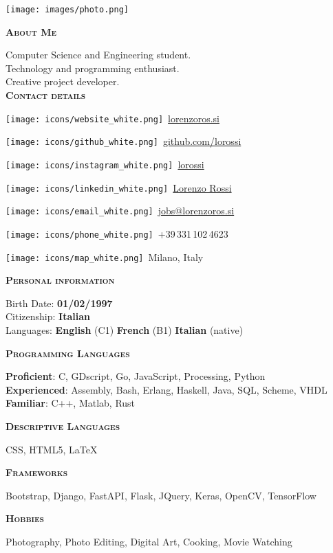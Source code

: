 \documentclass[11pt, a4paper]{article}
\makeatletter
\newcommand{\leftsection}[1]{\vspace*{2ex}\textsc{\textbf{#1}}\par%
\vspace*{-1.5ex}\hrulefill\par\vspace*{0.7ex}}
\newcommand{\websiteline}{\par{\texttt{[image: icons/website\_white.png]}}\ \href{https://www.lorenzoros.si}{lorenzoros.si}}
\newcommand{\emailline}{\par{\texttt{[image: icons/email\_white.png]}}\ \href{mailto:jobs@lorenzoros.si}{jobs@lorenzoros.si} }
\newcommand{\githubline}{\par{\texttt{[image: icons/github\_white.png]}}\ \href{https://www.github.com/lorossi}{github.com/lorossi}}
\newcommand{\linkedinline}{\par{\texttt{[image: icons/linkedin\_white.png]}}\ \href{https://www.linkedin.com/in/lorenzo-rossi-897628212/}{Lorenzo Rossi}}
\newcommand{\instagramline}{\par{\texttt{[image: icons/instagram\_white.png]}}\ \href{https://www.instagram.com/lorossi/}{lorossi}}
\newcommand{\phoneline}{\par{\texttt{[image: icons/phone\_white.png]}}\ +39\,331\,102\,4623}
\newcommand{\mapline}{\par{\texttt{[image: icons/map\_white.png]}}\ Milano, Italy}
\makeatother
\begin{document}
\setlength{\topskip}{0pt}
\setlength{\parindent}{0pt}
\setlength{\parskip}{0pt}
\setlength{\fboxsep}{0pt}
\pagestyle{empty}
\raggedbottom

\begin{minipage}[t]{0.30\textwidth} %

  \colorbox{cvblue}{
    \color{white}  %
    \hspace{1em}  %
    \begin{minipage}[t][\textheight][t]{0.82\textwidth}
      \raggedright
      \vspace*{2.5ex}

      \null\hfill\texttt{[image: images/photo.png]}\hfill\null

      \vspace*{0.5ex} %

      \leftsection{About Me}
      Computer Science and Engineering student. \\
      Technology and programming enthusiast. \\
      Creative project developer. \\

      \leftsection{Contact details}
      \small
      \websiteline \\[0.4ex]
      \githubline \\[0.4ex]
      \instagramline \\[0.4ex]
      \linkedinline
      \emailline \\[0.4ex]
      \phoneline \\[0.4ex]
      \mapline

      \normalsize

      \leftsection{Personal information}
      Birth Date: \textbf{01/02/1997} \\[0.5ex]
      Citizenship: \textbf{Italian} \\[0.5ex]
      Languages:
      \textbf{English} (C1)
      \textbf{French} (B1)
      \textbf{Italian} (native)

      \leftsection{Programming Languages}
      \textbf{Proficient}: C, GDscript, Go, JavaScript, Processing, Python \\
      \textbf{Experienced}: Assembly, Bash, Erlang, Haskell, Java, SQL, Scheme, VHDL \\
      \textbf{Familiar}: C++, Matlab, Rust

      \leftsection{Descriptive Languages}
      CSS, HTML5, \LaTeX

      \leftsection{Frameworks}
      Bootstrap, Django, FastAPI, Flask, JQuery, Keras, OpenCV, TensorFlow

      \leftsection{Hobbies}
      Photography, Photo Editing, Digital Art, Cooking, Movie Watching

    \end{minipage}%

    \hspace{1em}  %
  }
\end{minipage}%
\end{document}
